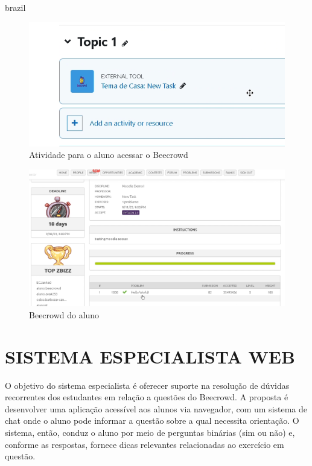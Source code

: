 \begin{otherlanguage*}{brazil}
\begin{figure}[H]
    \centering
            \caption{Atividade para o aluno acessar o Beecrowd}
            \label{fig:ModeloConceitual}
        \includegraphics[scale=0.4]{pictures/desenvolvimento/lti_tarefa.png}
\end{figure}

\begin{figure}[H]
    \centering
            \caption{Beecrowd do aluno}
            \label{fig:ModeloConceitual}
        \includegraphics[scale=0.4]{pictures/desenvolvimento/lti_beecrowd_aluno.png}
\end{figure}

\section{SISTEMA ESPECIALISTA WEB}

O objetivo do sistema especialista é oferecer suporte na resolução de dúvidas recorrentes dos estudantes em relação a questões do Beecrowd. A proposta é desenvolver uma aplicação acessível aos alunos via navegador, com um sistema de chat onde o aluno pode informar a questão sobre a qual necessita orientação. O sistema, então, conduz o aluno por meio de perguntas binárias (sim ou não) e, conforme as respostas, fornece dicas relevantes relacionadas ao exercício em questão.


\end{otherlanguage*}
